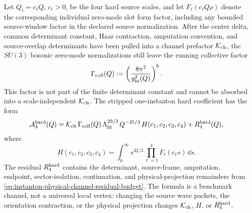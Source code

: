 Let \(Q_\ell=c_\ell Q\), \(c_\ell>0\), be the four hard source scales, and let
\(F_\ell(c_\ell Q\rho)\) denote the corresponding individual zero-mode slot
form factor, including any bounded source-window factor in the declared
source normalization.  After the center delta, common determinant
constant, Haar contraction, amputation convention, and source-overlap
determinants have been pulled into a channel prefactor
\(\mathcal K_{\rm ch}\), the \(SU(3)\) bosonic zero-mode normalizations still
leave the running collective factor
\[
  \Gamma_{\rm coll}(Q)
  :=
  \left(\frac{8\pi^2}{g_{\rm ht}^2(Q)}\right)^6 .
\]
This factor is not part of the finite determinant constant and cannot be
absorbed into a scale-independent \(\mathcal K_{\rm ch}\).  The stripped
one-instanton hard coefficient has the form
\begin{equation}
  \mathcal A_{4}^{\rm hard}(Q)
  =
  \mathcal K_{\rm ch}\,
  \Gamma_{\rm coll}(Q)\,
  \Lambda_{\rm ht}^{29/3}\,
  Q^{-35/3}\,
  H(c_1,c_2,c_3,c_4)
  +R_{4}^{\rm hard}(Q),
  \label{eq:instanton-hard-four-source-coefficient}
\end{equation}
where
\begin{equation}
  H(c_1,c_2,c_3,c_4)
  =
  \int_0^\infty
  s^{32/3}\prod_{\ell=1}^{4}F_\ell(c_\ell s)\,\dd s .
  \label{eq:instanton-hard-four-source-window-integral}
\end{equation}
The residual \(R_{4}^{\rm hard}\) contains the determinant, source-frame,
amputation, endpoint, sector-isolation, continuation, and physical-projection
remainders from \eqref{eq:instanton-physical-channel-residual-budget}.  The
formula is a benchmark channel, not a universal local vertex: changing the
source wave packets, the orientation contraction, or the physical projection
changes \(\mathcal K_{\rm ch}\), \(H\), or \(R_{4}^{\rm hard}\).

